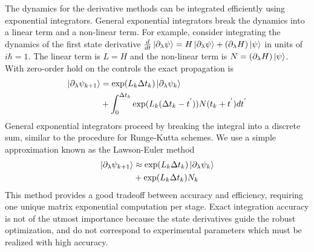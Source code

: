 The dynamics for the derivative methods can be integrated efficiently using exponential integrators.
General exponential integrators break the dynamics into a linear term and a non-linear term. For example, consider
integrating the dynamics of the first state derivative $\frac{d}{dt} \ket{\partial_{\lambda} \psi} =
H \ket{\partial_{\lambda} \psi} + (\partial_{\lambda} H) \ket{\psi}$ in units of $i\hbar = 1$.
The linear term is $L = H$ and the non-linear term is $N = (\partial_{\lambda} H) \ket{\psi}$.
With zero-order hold on the controls the exact propagation is
\begin{equation}
  \begin{aligned}
    \ket{\partial_{\lambda} \psi_{k + 1}} &= \exp(L_{k} \Delta t_{k}) \ket{\partial_{\lambda} \psi_{k}}\\
    &+ \int_{0}^{\Delta t_{k}} \exp(L_{k}(\Delta t_{k} - t^{'})) N(t_{k} + t^{'}) dt^{'}\\
  \end{aligned}
\end{equation}
General exponential integrators proceed by breaking the integral into a discrete sum, similar to the procedure
for Runge-Kutta schemes. We use a simple approximation known as the Lawson-Euler method \cite{berland2005solving}
\begin{equation}
  \begin{aligned}
    \ket{\partial_{\lambda} \psi_{k + 1}} &\approx \exp(L_{k} \Delta t_{k}) \ket{\partial_{\lambda} \psi_{k}}\\
    &+ \exp(L_{k} \Delta t_{k}) N_{k}\\
  \end{aligned}
\end{equation}
This method provides a good tradeoff between accuracy and efficiency, requiring one unique matrix
exponential computation per stage. Exact integration accuracy is not of the utmost importance because the
state derivatives guide the robust optimization, and do not correspond to experimental parameters
which must be realized with high accuracy.




